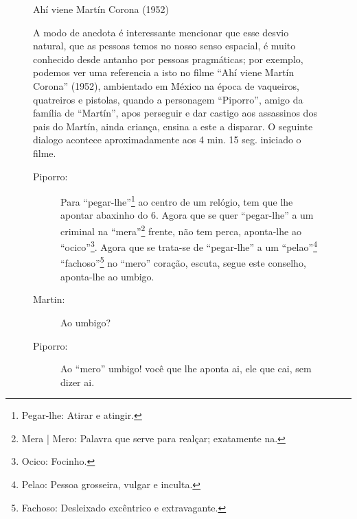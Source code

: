 \begin{figure}[!ht]
\begin{elaboracion}{Ah\'i viene Mart\'in Corona (1952)}

A modo de anedota é interessante mencionar que esse desvio natural,
que as pessoas temos no nosso senso espacial, 
é muito conhecido desde antanho por pessoas pragmáticas;
por exemplo, podemos ver uma referencia a isto no filme ``Ahí viene Martín Corona'' (1952),
ambientado em México na época de vaqueiros, quatreiros e pistolas,
quando a personagem ``Piporro'', amigo da família de ``Martín'', 
apos perseguir e dar castigo aos assassinos dos pais do Martín, ainda criança, 
ensina a este a disparar.
O seguinte dialogo acontece aproximadamente aos 4 min. 15 seg. iniciado o filme.
\begin{description}
\item[Piporro:] 
Para ``pegar-lhe''\footnote{\label{foot:pegarle}Pegar-lhe: Atirar e atingir.} ao centro de um relógio, 
tem que lhe apontar abaxinho do 6. %
Agora que se quer ``pegar-lhe'' a um criminal na 
``mera''\footnote{\label{foot:mera}Mera | Mero: Palavra que serve para realçar; exatamente na.} frente, não tem perca,
aponta-lhe ao ``ocico''\footnote{\label{foot:ocico}Ocico: Focinho.}.
Agora que se trata-se de ``pegar-lhe'' a 
um ``pelao''\footnote{\label{foot:pelao}Pelao: Pessoa grosseira, vulgar e inculta.} 
``fachoso''\footnote{\label{foot:fachoso}Fachoso: Desleixado excêntrico e extravagante.} no ``mero'' coração,
escuta, segue este conselho, aponta-lhe ao umbigo.

\item[Martin:] Ao umbigo?

\item[Piporro:] Ao ``mero'' umbigo! você que lhe aponta ai, ele que cai, sem dizer ai.
\end{description}
\end{elaboracion}
\end{figure}
